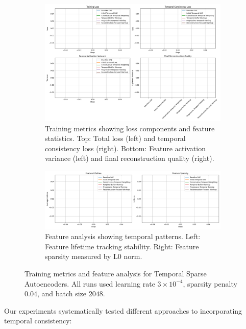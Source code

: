 \documentclass{article} %
\begin{document}
\begin{figure}[h]
    \centering
    \begin{subfigure}{0.49\textwidth}
        \includegraphics[width=\textwidth]{training_metrics.png}
        \caption{Training metrics showing loss components and feature statistics. Top: Total loss (left) and temporal consistency loss (right). Bottom: Feature activation variance (left) and final reconstruction quality (right).}
        \label{fig:training_metrics}
    \end{subfigure}
    \hfill
    \begin{subfigure}{0.49\textwidth}
        \includegraphics[width=\textwidth]{feature_analysis.png}
        \caption{Feature analysis showing temporal patterns. Left: Feature lifetime tracking stability. Right: Feature sparsity measured by L0 norm.}
        \label{fig:feature_analysis}
    \end{subfigure}
    \caption{Training metrics and feature analysis for Temporal Sparse Autoencoders. All runs used learning rate $3\times10^{-4}$, sparsity penalty $0.04$, and batch size $2048$.}
    \label{fig:results}
\end{figure}

Our experiments systematically tested different approaches to incorporating temporal consistency:
\end{document}
